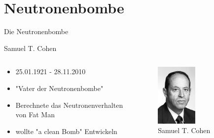 \section{Neutronenbombe}
\begin{frame}
	\begin{block}{Die Neutronenbombe}
	\end{block}
\end{frame}
\begin{frame}{Samuel T. Cohen}
	\begin{columns}[onlytextwidth]
		\begin{column}{0.45\textwidth}
			\begin{itemize}
				\item 25.01.1921 - 28.11.2010
				\item "Vater der Neutronenbombe"
				\item Berechnete das Neutronenverhalten von Fat Man
				\item wollte "a clean Bomb" Entwickeln
			\end{itemize}

		\end{column}
		\begin{column}{0.45\textwidth}
			\begin{figure}
				\centering
				\includegraphics[width=0.5\textwidth]{img/samuel_cohen.jpg}
				\caption{Samuel T. Cohen \cite{JewCurr}}
			\end{figure}
		\end{column}
	\end{columns}
\end{frame}

